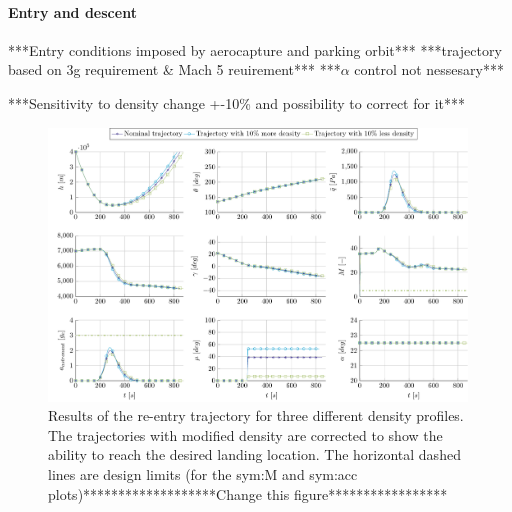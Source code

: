 \paragraph{Entry and descent}
***Entry conditions imposed by aerocapture and parking orbit***
***trajectory based on 3g requirement \& Mach 5 reuirement***
***$\alpha$ control not nessesary***

***Sensitivity to density change +-10\% and possibility to correct for it***\\
\begin{figure}
	\centering
	\includegraphics[width=0.99\textwidth]{Figure/Orbit/sensitivity_aerocapture.pdf}
	\caption{Results of the re-entry trajectory for three different density profiles. The trajectories with modified density are corrected to show the ability to reach the desired landing location. The horizontal dashed lines are design limits (for the \gls{sym:M} and \gls{sym:acc} plots)*******************Change this figure***************** }
	\label{fig:orbit_entry_data}
\end{figure}